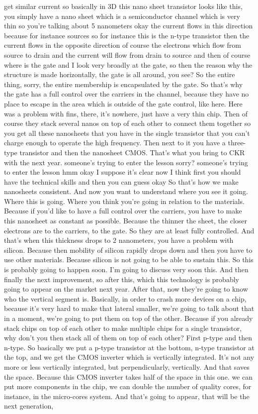 get similar current so basically in 3D this nano sheet transistor looks like this, you simply have a nano sheet which is a semiconductor channel which is very thin so you're talking about 5 nanometers okay the current flows in this direction because for instance sources so for instance this is the n-type transistor then the current flows in the opposite direction of course the electrons which flow from source to drain and the current will flow from drain to source and then of course where is the gate and I look very broadly at the gate, so then the reason why the structure is made horizontally, the gate is all around, you see? So the entire thing, sorry, the entire membership is encapsulated by the gate. So that's why the gate has a full control over the carriers in the channel, because they have no place to escape in the area which is outside of the gate control, like here. Here was a problem with fins, there, it's nowhere, just have a very thin chip. Then of course they stack several nanos on top of each other to connect them together so you get all these nanosheets that you have in the single transistor that you can't charge enough to operate the high frequency. Then next to it you have a three-type transistor and then the nanosheet CMOS. That's what you bring to CKR with the next year. someone's trying to enter the lesson sorry? someone's trying to enter the lesson hmm okay I suppose it's clear now I think first you should have the technical skills and then you can guess okay So that's how we make nanosheets consistent. And now you want to understand where you see it going. Where this is going. Where you think you're going in relation to the materials. Because if you'd like to have a full control over the carriers, you have to make this nanosheet as constant as possible. Because the thinner the sheet, the closer electrons are to the carriers, to the gate. So they are at least fully controlled. And that's when this thickness drops to 2 nanometers, you have a problem with silicon. Because then mobility of silicon rapidly drops down and then you have to use other materials. Because silicon is not going to be able to sustain this. So this is probably going to happen soon. I'm going to discuss very soon this. And then finally the next improvement, so after this, which this technology is probably going to appear on the market next year. After that, now they're going to know who the vertical segment is. Basically, in order to crash more devices on a chip, because it's very hard to make that lateral smaller, we're going to talk about that in a moment, we're going to put them on top of the other. Because if you already stack chips on top of each other to make multiple chips for a single transistor, why don't you then stack all of them on top of each other? First p-type and then n-type. So basically we put a p-type transistor at the bottom, n-type transistor at the top, and we get the CMOS inverter which is vertically integrated. It's not any more or less vertically integrated, but perpendicularly, vertically. And that saves the space. Because this CMOS inverter takes half of the space in this one. we can put more components in the chip, we can double the number of quality cores, for instance, in the micro-cores system. And that's going to appear, that will be the next generation, 